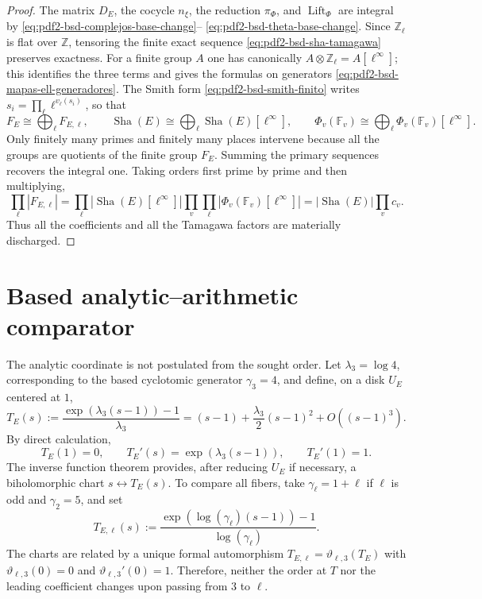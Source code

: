 \begin{proof}
The matrix $D_E$, the cocycle $n_\xi$, the reduction $\pi_\Phi$, and
$\operatorname{Lift}_\Phi$ are integral by
\eqref{eq:pdf2-bsd-complejos-base-change}--
\eqref{eq:pdf2-bsd-theta-base-change}. Since $\mathbb Z_\ell$ is flat over
$\mathbb Z$, tensoring the finite exact sequence
\eqref{eq:pdf2-bsd-sha-tamagawa} preserves exactness. For a finite group
$A$ one has canonically
$A\otimes\mathbb Z_\ell=A[\ell^\infty]$; this identifies the three terms
and gives the formulas on generators
\eqref{eq:pdf2-bsd-mapas-ell-generadores}. The Smith form
\eqref{eq:pdf2-bsd-smith-finito} writes
$s_i=\prod_\ell\ell^{v_\ell(s_i)}$, so that
\[
 F_E\cong\bigoplus_\ell F_{E,\ell},\qquad
 \operatorname{Sha}(E)\cong
   \bigoplus_\ell\operatorname{Sha}(E)[\ell^\infty],\qquad
 \Phi_v(\mathbb F_v)\cong
   \bigoplus_\ell\Phi_v(\mathbb F_v)[\ell^\infty].
\]
Only finitely many primes and finitely many places intervene because all the groups
are quotients of the finite group $F_E$. Summing the primary sequences recovers
the integral one. Taking orders first prime by prime and then multiplying,
\begin{equation}\label{eq:pdf2-bsd-cardinal-sts-todos-ell}
 \prod_\ell|F_{E,\ell}|
 =\prod_\ell|\operatorname{Sha}(E)[\ell^\infty]|
   \prod_v\prod_\ell|\Phi_v(\mathbb F_v)[\ell^\infty]|
 =|\operatorname{Sha}(E)|\prod_vc_v.
\end{equation}
Thus all the coefficients and all the Tamagawa factors are materially discharged.
\end{proof}

\section{Based analytic--arithmetic comparator}

The analytic coordinate is not postulated from the sought order. Let
$\lambda_3=\log4$, corresponding to the based cyclotomic generator
$\gamma_3=4$, and define, on a disk $U_E$ centered at $1$,
\begin{equation}\label{eq:pdf2-bsd-t-e-construido}
 T_E(s):=\frac{\exp(\lambda_3(s-1))-1}{\lambda_3}
 =(s-1)+\frac{\lambda_3}{2}(s-1)^2+O((s-1)^3).
\end{equation}
By direct calculation,
\begin{equation}\label{eq:pdf2-bsd-t-e-normalizacion-probada}
 T_E(1)=0,
 \qquad T_E'(s)=\exp(\lambda_3(s-1)),
 \qquad T_E'(1)=1.
\end{equation}
The inverse function theorem provides, after reducing $U_E$ if
necessary, a biholomorphic chart $s\leftrightarrow T_E(s)$.
To compare all fibers, take
$\gamma_\ell=1+\ell$ if $\ell$ is odd and $\gamma_2=5$, and set
\begin{equation}\label{eq:pdf2-bsd-t-ell-construido}
 T_{E,\ell}(s):=
 \frac{\exp(\log(\gamma_\ell)(s-1))-1}{\log(\gamma_\ell)}.
\end{equation}
The charts are related by a unique formal automorphism
$T_{E,\ell}=\vartheta_{\ell,3}(T_E)$ with
$\vartheta_{\ell,3}(0)=0$ and $\vartheta_{\ell,3}'(0)=1$. Therefore, neither the
order at $T$ nor the leading coefficient changes upon passing from $3$ to $\ell$.

